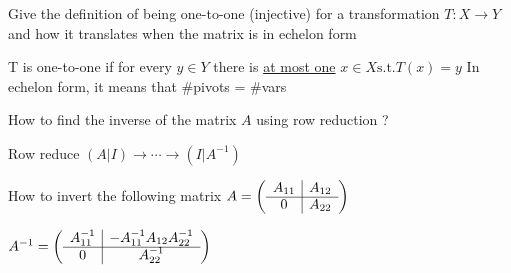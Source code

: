 \documentclass[12pt]{article}
\newcommand*{\xfield}[1]{\begin{mdframed}\centering #1\end{mdframed}\bigskip}
\newenvironment{note}{}{}
\begin{document}
\begin{note}
    \xfield{Give the definition of being one-to-one (injective) for a transformation $T : X \rightarrow Y$ and how it translates when the matrix is in echelon form}
    \xfield{T is one-to-one if for every \begin{math}y \in Y\end{math} there is \underline{at most one} \begin{math}x \in X \text{s.t.} T(x)=y\end{math} In echelon form, it means that \#pivots = \#vars}
\end{note}

\begin{note}
\xfield{How to find the inverse of the matrix $A$ using row reduction ?}
\xfield{Row reduce $(A\lvert I) \rightarrow \cdots \rightarrow (I \lvert A^{-1})$}
\end{note}

\begin{note}
\xfield{How to invert the following matrix  $ A = \left(
    \begin{array}{c|c}
      A_{11}&A_{12}\\\cline{1-2}
      0&A_{22}
    \end{array}
  \right)$}
\xfield{$A^{-1} = \left(
    \begin{array}{c|c}
      A^{-1}_{11}&-A^{-1}_{11}A_{12}A^{-1}_{22}\\\cline{1-2}
      0&A^{-1}_{22}
    \end{array}
  \right)$}
\end{note}
\end{document}
